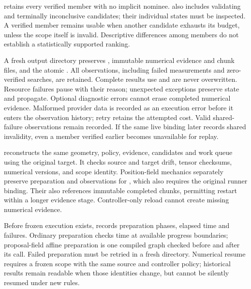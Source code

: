  retains every verified member with no implicit
nominee.  also includes validating and terminally
inconclusive candidates; their individual states must be inspected. A verified
member remains usable when another candidate exhausts its budget, unless the
scope itself is invalid. Descriptive differences among members do not establish
a statistically supported ranking.

A fresh output directory preserves , immutable
numerical evidence and chunk files, and the atomic
. All observations, including failed measurements
and zero-verified searches, are retained. Complete results use
 and are never overwritten. Resource failures
pause with their reason; unexpected exceptions preserve state and propagate.
Optional diagnostic errors cannot erase completed numerical evidence.
Malformed provider data is recorded as an execution error before it enters the
observation history; retry retains the attempted cost. Valid shared-failure
observations remain recorded. If the same live binding later records shared
invalidity, even a member verified earlier becomes unavailable for replay.

 reconstructs the same geometry, policy,
evidence, candidates and work queue using the original target. It checks source
and target drift, tensor checksums, numerical versions, and scope identity.
Position-field mechanics separately preserve preparation and observations for
, which also requires the original
runner binding. Their  also references immutable
completed chunks, permitting restart within a longer evidence stage.
Controller-only reload cannot create missing numerical evidence.

Before frozen execution exists,  records
preparation phases, elapsed time and failures. Ordinary preparation checks time
at available progress boundaries; proposal-field affine preparation is one
compiled graph checked before and after its call. Failed preparation must be
retried in a fresh directory. Numerical resume requires a frozen scope with
the same source and controller policy; historical results remain readable when
those identities change, but cannot be silently resumed under new rules.

